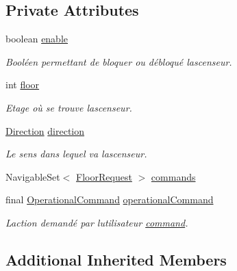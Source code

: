 \subsection*{Private Attributes}
\begin{DoxyCompactItemize}
\item 
boolean \mbox{\hyperlink{classcontrol_1_1_impl_command_control_a80ffb0738b94ae89c8b32d60f9f2fcd0}{enable}}
\begin{DoxyCompactList}\small\item\em Booléen permettant de bloquer ou débloqué l\textquotesingle{}ascenseur. \end{DoxyCompactList}\item 
int \mbox{\hyperlink{classcontrol_1_1_impl_command_control_acbd6195b1d21b55b2c9c96d144f98671}{floor}}
\begin{DoxyCompactList}\small\item\em Etage où se trouve l\textquotesingle{}ascenseur. \end{DoxyCompactList}\item 
\mbox{\hyperlink{enumcontrol_1_1command_1_1_direction}{Direction}} \mbox{\hyperlink{classcontrol_1_1_impl_command_control_ae982796e5a99ef48f6b9db87ddb82ad7}{direction}}
\begin{DoxyCompactList}\small\item\em Le sens dans lequel va l\textquotesingle{}ascenseur. \end{DoxyCompactList}\item 
Navigable\+Set$<$ \mbox{\hyperlink{classcontrol_1_1command_1_1_floor_request}{Floor\+Request}} $>$ \mbox{\hyperlink{classcontrol_1_1_impl_command_control_afc3d3dfd36511a07dd41e717df3b13f9}{commands}}
\item 
final \mbox{\hyperlink{interfacecontrol_1_1_operational_command}{Operational\+Command}} \mbox{\hyperlink{classcontrol_1_1_impl_command_control_adbe2ee9057a11e4d2408947f5ff83cd5}{operational\+Command}}
\begin{DoxyCompactList}\small\item\em L\textquotesingle{}action demandé par l\textquotesingle{}utilisateur \mbox{\hyperlink{namespacecontrol_1_1command}{command}}. \end{DoxyCompactList}\end{DoxyCompactItemize}
\subsection*{Additional Inherited Members}


